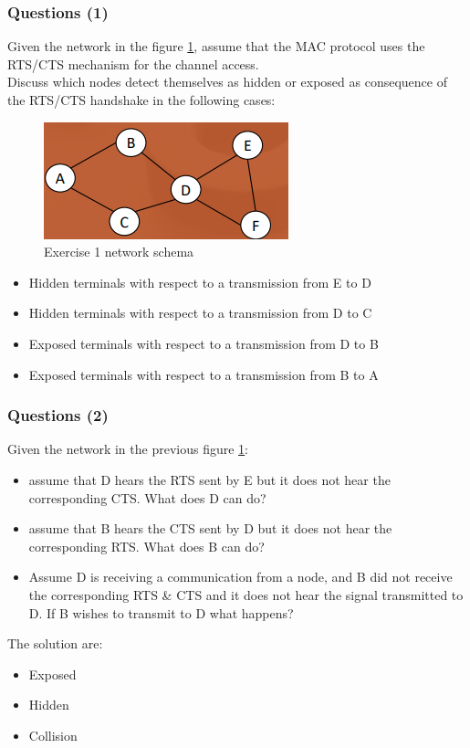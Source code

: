 \documentclass[10pt,a4paper]{report}
\theoremstyle{definition}
\begin{document}
\subsubsection{Questions (1)}
Given the network in the figure \ref{wn-q1}, assume that the MAC protocol uses the RTS/CTS mechanism for the channel access.\\
Discuss which nodes detect themselves as hidden or exposed as
consequence of the RTS/CTS handshake in the following cases:
\begin{figure}[h!]
	\centering
	\includegraphics[scale=0.50]{images/Pasted image 20230531110613.png}
	\caption{Exercise 1 network schema}
	\label{wn-q1}
\end{figure}
\begin{itemize}
	\item Hidden terminals with respect to a transmission from E to D
	\item Hidden terminals with respect to a transmission from D to C
	\item Exposed terminals with respect to a transmission from D to B
	\item Exposed terminals with respect to a transmission from B to A
\end{itemize}



\subsubsection{Questions (2)}\label{sec:questions-2}
Given the network in the previous figure \ref{wn-q1}:
\begin{itemize}
	\item assume that D hears the RTS sent by E but it does not hear the
	corresponding CTS. What does D can do?
	\item assume that B hears the CTS sent by D but it does not hear the
	corresponding RTS. What does B can do?
	\item Assume D is receiving a communication from a node, and B
	did not receive the corresponding RTS \& CTS and it does not
	hear the signal transmitted to D. If B wishes to transmit to D
	what happens?
\end{itemize}
The solution are:
\begin{itemize}
	\item 
	Exposed
	\item 
	Hidden
	\item 
	Collision
\end{itemize}
\end{document}
